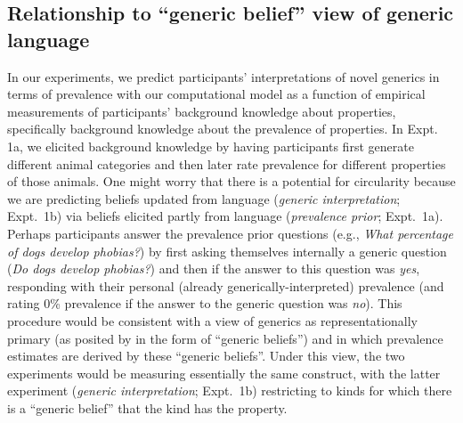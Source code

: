 \documentclass[floatsintext,man]{apa6}
\begin{document}
\subsection{Relationship to ``generic belief'' view of generic language}

In our experiments, we predict participants' interpretations of novel generics in terms of prevalence with our computational model as a function of empirical measurements of participants' background knowledge about properties, specifically background knowledge about the prevalence of properties. 
In Expt. 1a, we elicited background knowledge by having participants first generate different animal categories and then later rate prevalence for different properties of those animals.
One might worry that there is a potential for circularity because we are predicting beliefs updated from language (\emph{generic interpretation}; Expt.~1b) via beliefs elicited partly from language (\emph{prevalence prior}; Expt.~1a).
Perhaps participants answer the prevalence prior questions (e.g., \emph{What percentage of dogs develop phobias?}) by first asking themselves internally a generic question (\emph{Do dogs develop phobias?}) and then  if the answer to this question was \emph{yes}, responding with their personal (already generically-interpreted) prevalence (and rating 0\% prevalence if the answer to the generic question was \emph{no}).
This procedure would be consistent with a view of generics as representationally primary (as posited by  in the form of \enquote{generic beliefs}) and in which prevalence estimates are derived by these \enquote{generic beliefs}. 
Under this view, the two experiments would be measuring essentially the same construct, with the latter experiment (\emph{generic interpretation}; Expt.~1b) restricting to  kinds for which there is a ``generic belief'' that the kind has the property. 
\end{document}
